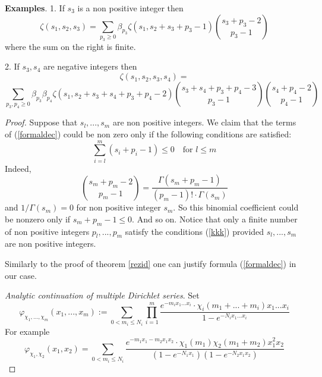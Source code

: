 \documentclass[10pt]{article}
\begin{document}
{\bf Examples}. 1. If  $s_3$   is a   non positive integer then 
$$
\zeta(s_1, s_2, s_3) =
\sum_{ p_3 \geq 0}     \beta_{ p_3} \zeta( s_1,s_2 + s_3 + p_3 -1)
\binom{  s_3 + p_3   - 2 }{  p_3-1}
$$
 where the sum on the right is finite.
   
2. If  $s_3, s_4$   are negative integers then 
$$
\zeta(s_1, s_2, s_3, s_4) =
$$
$$
\sum_{ p_3, p_4 \geq 0} \beta_{ p_3} \beta_{ p_4}
\zeta( s_1,s_2 + s_3 + s_4 + p_3 + p_4-2)\binom{s_3+s_4 + p_3 +  p_4 -3 }{  p_3-1}\binom{ s_4+  p_4  - 2 }{  p_4-1}
$$

\begin{proof} Suppose that $s_l,...,s_m$ are  non positive   integers.
We claim that the terms of (\ref{formaldec}) could be non zero only if the following conditions are satisfied:
\begin{equation} \label{kkk} 
 \sum_{i=l}^m (s_i + p_i -1) \leq 0 \quad \mbox{for $l \leq m$} 
\end{equation}
 Indeed,
$$
\binom{s_m + p_m -2}{ p_m-1} = \frac{\Gamma(s_m + p_m -1)}{(p_m-1)!\cdot \Gamma(s_m)}
$$
and $1/\Gamma(s_m)=0$ for non positive   integer $s_m$. So this binomial coefficient could be nonzero only if $s_m + p_m -1\leq  0$. 
And so on. 
Notice that only a finite number of non positive integers $p_l,...,p_m$ satisfy the  conditions (\ref{kkk}) provided $s_l,...,s_m$ are  non positive   integers.

Similarly to the proof of theorem \ref{rezid} one can justify formula (\ref{formaldec}) in our case.


{\it Analytic continuation of multiple Dirichlet series}. Set 
$$
\varphi_{\chi_1,...,\chi_m}(x_1,...,x_m):= \sum_{0< m_i \leq  N_i } \prod_{i=1}^m\frac{e^{-m_ix_1...x_i}\cdot\chi_i(m_1+...+m_i) x_1...x_i}{1-e^{-N_ix_1...x_i}}
$$
For example
$$
\varphi_{\chi_1 ,\chi_2}(x_1,x_2) = \sum_{0< m_i \leq  N_i }  \frac{e^{-m_1x_1  - m_2x_1x_2}\cdot\chi_1(m_1 ) \chi_2(m_1 +m_2)x^2_1 x_2}{(1-e^{-N_1x_1})(1-e^{-N_2x_1 x_2})}
$$


\end{proof}
\end{document}
